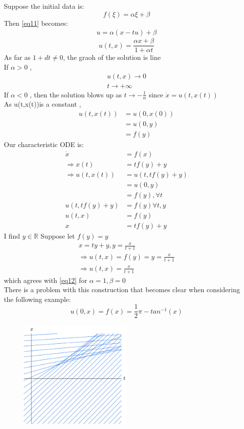 \begin{example}[]{}
 Suppose the initial data is:
 $$
    f(\xi)=\alpha \xi+\beta
 $$ 
 Then \eqref{eq11} becomes:
 \begin{align*}{}{}
 u=\alpha(x-tu)+\beta 
 \end{align*} 
 \begin{equation}
        \label{eq12} u(t,x)=\frac{\alpha x+\beta}{1+\alpha t}
 \end{equation} 
 As far as $ 1+dt\neq 0 $, the graoh of the solution is line 
 \\If $ \alpha>0 $ ,\begin{align*}{}{}
 u(t,x)\rightarrow 0\\
 t\rightarrow +\infty
 \end{align*} 
If $ \alpha<0 $ , then the solution blows up as $ t\rightarrow -\frac{1}{\alpha} $
since $ \dot{x}=u(t,x(t)) $
\\As u(t,x(t))is a constant ,
\begin{align*}{}{}
u(t,x(t))&=u(0,x(0))\\
&=u(0,y)\\
&=f(y)
\end{align*}
Our characteristic ODE is:
\begin{align*}{}{}
\dot{x}&=f(x)\\
\Rightarrow x(t)&=tf(y)+y\\
\Rightarrow u(t,x(t))&=u(t,tf(y)+y)\\
&=u(0,y)\\
&=f(y), \forall t\\
u(t,tf(y)+y)&=f(y) \forall t, y\\
u(t,x)&=f(y)\\
x&=tf(y)+y
\end{align*}
I find $ y\in \mathbb{R} $
Suppose let $ f(y)=y $
\begin{align*}{}{}
x=ty+y,y=\frac{x}{t+1}\\
\Rightarrow u(t,x)=f(y)=y=\frac{x}{t+1}\\
\Rightarrow u(t,x)=\frac{x}{t+1}
\end{align*}  
which agrees with \eqref{eq12} for $ \alpha=1,\beta=0 $\\
There is a problem with this construction that becomes clear when considering the following example:
$$
    u(0,x)=f(x)=\frac{1}{2}\pi-tan^{-1}(x)
$$ 
\begin{figure}[H]
	\centering
	\includegraphics[height = 0.4\textwidth, width = 0.5\textwidth]{resource/cline.png}

\end{figure}
\end{example}
